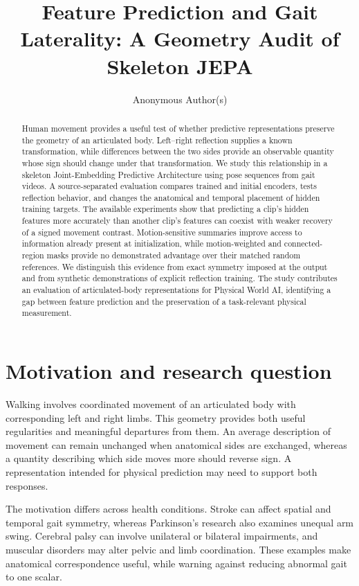 \documentclass{article}
\title{Feature Prediction and Gait Laterality: A Geometry Audit of Skeleton JEPA}
\author{Anonymous Author(s)}
\begin{document}
\maketitle
\begin{abstract}
Human movement provides a useful test of whether predictive representations preserve the geometry of an articulated body. Left--right reflection supplies a known transformation, while differences between the two sides provide an observable quantity whose sign should change under that transformation. We study this relationship in a skeleton Joint-Embedding Predictive Architecture using pose sequences from gait videos. A source-separated evaluation compares trained and initial encoders, tests reflection behavior, and changes the anatomical and temporal placement of hidden training targets. The available experiments show that predicting a clip's hidden features more accurately than another clip's features can coexist with weaker recovery of a signed movement contrast. Motion-sensitive summaries improve access to information already present at initialization, while motion-weighted and connected-region masks provide no demonstrated advantage over their matched random references. We distinguish this evidence from exact symmetry imposed at the output and from synthetic demonstrations of explicit reflection training. The study contributes an evaluation of articulated-body representations for Physical World AI, identifying a gap between feature prediction and the preservation of a task-relevant physical measurement.
\end{abstract}
\section{Motivation and research question}\label{motivation-and-research-question}

Walking involves coordinated movement of an articulated body with corresponding left and right limbs. This geometry provides both useful regularities and meaningful departures from them. An average description of movement can remain unchanged when anatomical sides are exchanged, whereas a quantity describing which side moves more should reverse sign. A representation intended for physical prediction may need to support both responses.

The motivation differs across health conditions. Stroke can affect spatial and temporal gait symmetry, whereas Parkinson's research also examines unequal arm swing. Cerebral palsy can involve unilateral or bilateral impairments, and muscular disorders may alter pelvic and limb coordination. These examples make anatomical correspondence useful, while warning against reducing abnormal gait to one scalar.
\end{document}
